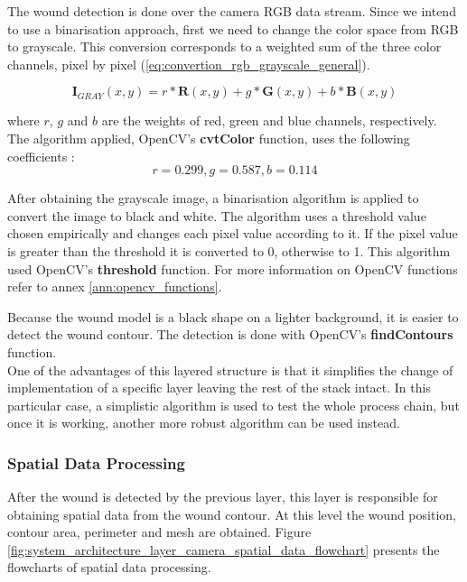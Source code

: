 The wound detection is done over the camera RGB data stream. Since we intend to use a binarisation approach, first we need to change the color space from RGB to grayscale. This conversion corresponds to a weighted sum of the three color channels, pixel by pixel (\ref{eq:convertion_rgb_grayscale_general}).

\begin{equation}
\boldsymbol{I}_{GRAY}(x,y) = r * \boldsymbol{R}(x,y) + g * \boldsymbol{G}(x,y) + b * \boldsymbol{B}(x,y)
\label{eq:convertion_rgb_grayscale_general}
\end{equation}

where $r$, $g$ and $b$ are the weights of red, green and blue channels, respectively. The algorithm applied,  OpenCV's \textbf{cvtColor} function, uses the following coefficients \cite{OpenCV2020_color_conversions, ITU2020_grayscale_conversion}: 
$$ r = 0.299, g = 0.587, b = 0.114 $$

After obtaining the grayscale image, a binarisation algorithm is applied to convert the image to black and white. The algorithm uses a threshold value chosen empirically and changes each pixel value according to it. If the pixel value is greater than the threshold it is converted to 0, otherwise to 1. This algorithm used OpenCV's \textbf{threshold} function. For more information on OpenCV functions refer to annex \ref{ann:opencv_functions}.

Because the wound model is a black shape on a lighter background, it is easier to detect the wound contour. The detection is done with OpenCV's \textbf{findContours} function.\\

One of the advantages of this layered structure is that it simplifies the change of implementation of a specific layer leaving the rest of the stack intact. In this particular case, a simplistic algorithm is used to test the whole process chain, but once it is working, another more robust algorithm can be used instead.


\subsubsection*{Spatial Data Processing}
\label{subsubsec:system_architectural_camera_layers_spatial_data}

After the wound is detected by the previous layer, this layer is responsible for obtaining spatial data from the wound contour. At this level the wound position, contour area, perimeter and mesh are obtained. Figure \ref{fig:system_architecture_layer_camera_spatial_data_flowchart} presents the flowcharts of spatial data processing.

